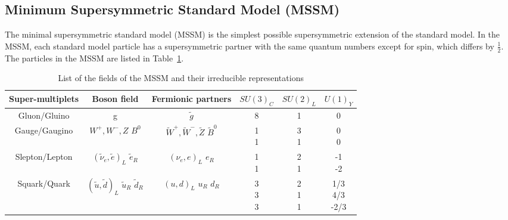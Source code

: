 \clearpage
\subsection{Minimum Supersymmetric Standard Model (MSSM)}

The minimal supersymmetric standard model (MSSM) is the simplest possible supersymmetric extension of the standard model. In the MSSM, each standard model particle has a supersymmetric partner with the same quantum numbers except for spin, which differs by $\frac{1}{2}$. The particles in the MSSM are listed in Table~\ref{tab:c2mssmf}.

\begin{table}[htbp]
\fontsize{10 pt}{1.2 em}
\selectfont
\begin{centering}
\caption{\label{tab:c2mssmf}List of the fields of the MSSM and their irreducible representations}
\hspace*{-4ex}
\begin{tabular}{|c|c|c|c|c|c|}
\hline
Super-multiplets & Boson field & Fermionic partners & $SU(3)_{C}$ & $SU(2)_{L}$ & $U(1)_{Y}$ \\
\hline
Gluon/Gluino     & g & $\tilde{g}$ & 8 & 1 & 0 \\
\hline
Gauge/Gaugino    & \specialcell{$W^{+},W^{-},Z$ \\ $B^{0}$} & \specialcell{$\tilde{W}^{+},\tilde{W}^{-},\tilde{Z}$ \\ $\tilde{B}^{0}$} & \specialcell{1 \\ 1} & \specialcell{3 \\ 1} & \specialcell{0 \\ 0} \\
\hline
Slepton/Lepton   & \specialcell{$(\tilde{\nu}_{e},\tilde{e})_{L}$ \\ $\tilde{e}_{R}$} & \specialcell{$(\nu_{e},e)_{L}$ \\ $e_{R}$} & \specialcell{1 \\ 1} & \specialcell{2 \\ 1} & \specialcell{-1 \\ -2} \\
\hline
Squark/Quark     & \specialcell{$(\tilde{u},\tilde{d})_{L}$ \\ $\tilde{u}_{R}$ \\ $\tilde{d}_{R}$} & \specialcell{$(u,d)_{L}$ \\ $u_{R}$ \\ $d_{R}$} & \specialcell{3 \\ 3 \\ 3} & \specialcell{2 \\ 1 \\ 1} & \specialcell{1/3 \\ 4/3 \\ -2/3} \\

\end{tabular}
\end{centering}
\end{table}
